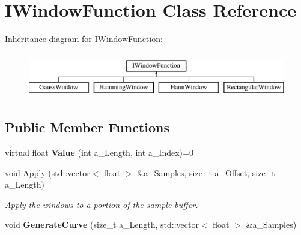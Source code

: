\hypertarget{class_i_window_function}{}\section{I\+Window\+Function Class Reference}
\label{class_i_window_function}
Inheritance diagram for I\+Window\+Function\+:\begin{figure}[H]
\begin{center}
\leavevmode
\includegraphics[height=2.000000cm]{class_i_window_function}
\end{center}
\end{figure}
\subsection*{Public Member Functions}
\begin{DoxyCompactItemize}
\item 
\mbox{\label{class_i_window_function_a8863127c872ee0c38242b38e645b56e8}} 
virtual float {\bfseries Value} (int a\+\_\+\+Length, int a\+\_\+\+Index)=0
\item 
\mbox{\label{class_i_window_function_ac7e097cdf897129e2981e468bdd02b00}} 
void \hyperlink{class_i_window_function_ac7e097cdf897129e2981e468bdd02b00}{Apply} (std\+::vector$<$ float $>$ \&a\+\_\+\+Samples, size\+\_\+t a\+\_\+\+Offset, size\+\_\+t a\+\_\+\+Length)
\begin{DoxyCompactList}\small\item\em Apply the windows to a portion of the sample buffer. \end{DoxyCompactList}\item 
\mbox{\label{class_i_window_function_a9f524f3dd56a3098c02ce42f48edb1d0}} 
void {\bfseries Generate\+Curve} (size\+\_\+t a\+\_\+\+Length, std\+::vector$<$ float $>$ \&a\+\_\+\+Samples)
\end{DoxyCompactItemize}
